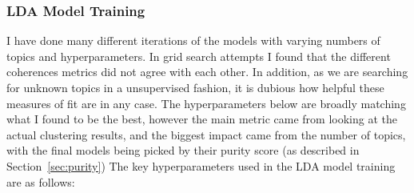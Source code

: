 \documentclass[12pt]{article}
\begin{document}
\subsubsection{LDA Model Training}

I have done many different iterations of the models with varying numbers of topics and
hyperparameters. In grid search attempts I found that the different coherences metrics did not agree
with each other. In addition, as we are searching for unknown topics in a unsupervised fashion, it
is dubious how helpful these measures of fit are in any case. The hyperparameters below are broadly
matching what I found to be the best, however the main metric came from looking at the actual
clustering results, and the biggest impact came from the number of topics, with the final models
being picked by their purity score (as described in Section~\ref{sec:purity}) The key
hyperparameters used in the LDA model training are as follows:
\end{document}
